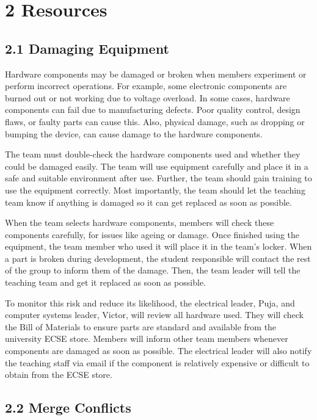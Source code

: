 \section*{2 Resources}

\subsection*{2.1 Damaging Equipment}

Hardware components may be damaged or broken when members experiment or perform incorrect operations. For example, some electronic components are burned out or not working due to voltage overload. In some cases, hardware components can fail due to manufacturing defects. Poor quality control, design flaws, or faulty parts can cause this. Also, physical damage, such as dropping or bumping the device, can cause damage to the hardware components.

The team must double-check the hardware components used and whether they could be damaged easily. The team will use equipment carefully and place it in a safe and suitable environment after use. Further, the team should gain training to use the equipment correctly. Most importantly, the team should let the teaching team know if anything is damaged so it can get replaced as soon as possible.

When the team selects hardware components, members will check these components carefully, for issues like ageing or damage. Once finished using the equipment, the team member who used it will place it in the team's locker. When a part is broken during development, the student responsible will contact the rest of the group to inform them of the damage. Then, the team leader will tell the teaching team and get it replaced as soon as possible. 

To monitor this risk and reduce its likelihood, the electrical leader, Puja, and computer systems leader, Victor, will review all hardware used. They will check the Bill of Materials to ensure parts are standard and available from the university ECSE store. Members will inform other team members whenever components are damaged as soon as possible. The electrical leader will also notify the teaching staff via email if the component is relatively expensive or difficult to obtain from the ECSE store.

\subsection*{2.2 Merge Conflicts}

